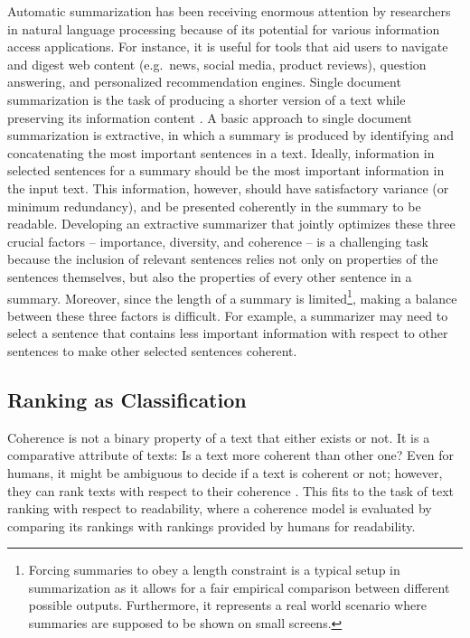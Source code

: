 Automatic summarization has been receiving enormous attention by researchers in natural language processing because of its potential for various information access applications. 
For instance, it is useful for tools that aid users to navigate and digest web content (e.g.\ news, social media, product reviews), question answering, and personalized recommendation engines. 
Single document summarization is the task of producing a shorter version of a text while preserving its information content \cite{nenkova11}. 
A basic approach to single document summarization is extractive, in which a summary is produced by identifying and concatenating the most important sentences in a text. 
Ideally, information in selected sentences for a summary should be the most important information in the input text. 
This information, however, should have satisfactory variance (or minimum redundancy), and be presented coherently in the summary to be readable. 
Developing an extractive summarizer that jointly optimizes these three crucial factors -- importance, diversity, and coherence -- is a challenging task because the inclusion of relevant sentences relies not only on properties of the sentences themselves, but also the properties of every other sentence in a summary. 
Moreover, since the length of a summary is limited\footnote{Forcing summaries to obey a length constraint is a typical setup in summarization as it allows for a fair empirical comparison between different possible outputs. 
 Furthermore, it represents a real world scenario where summaries are supposed to be shown on small screens. 
}, making a balance between these three factors is difficult. 
For example, a summarizer may need to select a sentence that contains less important information with respect to other sentences to make other selected sentences coherent. 

\subsection{Ranking as Classification} 

Coherence is not a binary property of a text that either exists or not. 
It is a comparative attribute of texts: Is a text more coherent than other one? 
Even for humans, it might be ambiguous to decide if a text is coherent or not; however, they can rank texts with respect to their coherence \cite{halliday76}. 
This fits to the task of text ranking with respect to readability, where a coherence model is evaluated by comparing its rankings with rankings provided by humans for readability. 

